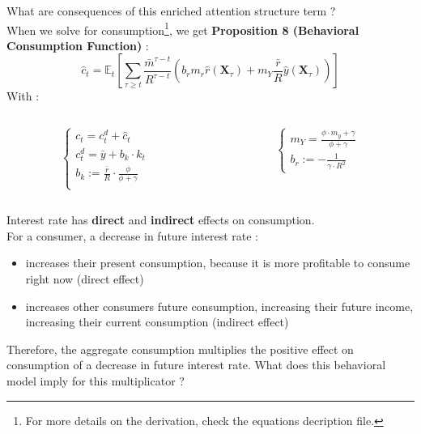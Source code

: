 \documentclass{beamer}
\begin{document}
\begin{frame}{\subsecname}
    What are consequences of this enriched attention structure term ? \\
    When we solve for consumption\footnote{For more details on the derivation, check the equations decription file.}, we get \textbf{Proposition 8 (Behavioral Consumption Function)} :
    \begin{equation}\tag{52}
        \hat{c}_{t}=\mathbb{E}_{t}\left[\sum_{\tau\geq t}\frac{\bar{m}^{\tau-t}}{R^{\tau-t}}\left(b_{r}m_{r}\hat{r}(\textbf{X}_{\tau})+m_{Y}\frac{\bar{r}}{R}\hat{y}(\textbf{X}_{\tau})\right)\right]
    \end{equation}
    With :
    \begin{columns}
        \begin{column}{0.5\textwidth}
            \begin{equation*}
                \begin{cases}
                    c_{t}=c_{t}^{d}+\hat{c}_{t} \\ 
                    c^{d}_{t} = \bar{y} + b_{k}\cdot k_{t} \\
                    b_{k}:=\frac{\bar{r}}{R}\cdot\frac{\phi}{\phi+\gamma} \\ 
                \end{cases}
            \end{equation*}
        \end{column}
        \begin{column}{0.5\textwidth}  %
             \begin{equation*}
                \begin{cases}
                    m_{Y}=\frac{\phi\cdot m_{y}+\gamma}{\phi+\gamma} \\
                    b_{r}:=-\frac{1}{\gamma\cdot R^{2}}
                \end{cases}
             \end{equation*}
        \end{column}
    \end{columns}
\end{frame}

\begin{frame}{\subsecname}
    Interest rate has \textbf{direct} and \textbf{indirect} effects on consumption. \\ 
    For a consumer, a decrease in future interest rate : 
    \begin{itemize}
        \item increases their present consumption, because it is more profitable to consume right now (direct effect)
        \item increases other consumers future consumption, increasing their future income, increasing their current consumption (indirect effect)
    \end{itemize}
    Therefore, the aggregate consumption multiplies the positive effect on consumption of a decrease in future interest rate. 
    What does this behavioral model imply for this multiplicator ?
\end{frame}
\end{document}
